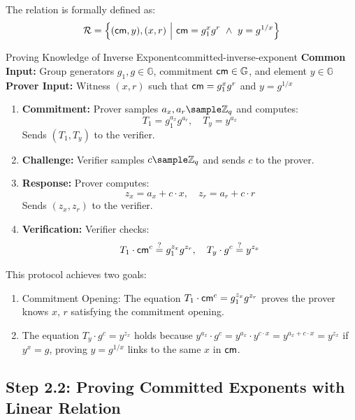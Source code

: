 The relation is formally defined as:
\[
\mathcal{R} = \left\{ (\cm, y), (x, r) \ \middle|\ \cm = g_1^x g^r \ \land\ y = g^{1/x} \right\}
\]

\begin{protocol}{Proving Knowledge of Inverse Exponent}{committed-inverse-exponent}\label{pok-committed-inverse-exponent}
\textbf{Common Input:} Group generators $g_1, g \in \mathbb{G}$, commitment $\mathsf{cm} \in \mathbb{G}$, and element $y \in \mathbb{G}$ \\
\textbf{Prover Input:} Witness $(x, r)$ such that $\mathsf{cm} = g_1^x g^r$ and $y = g^{1/x}$
\begin{enumerate}
    \item \textbf{Commitment:} Prover samples $a_x, a_r \sample \mathbb{Z}_q$ and computes:
    \[
    T_1 = g_1^{a_x} g^{a_r}, \quad T_y = y^{a_x}
    \]
    Sends $(T_1, T_y)$ to the verifier.

    \item \textbf{Challenge:} Verifier samples $c  \sample  \mathbb{Z}_q$ and sends $c$ to the prover.

    \item \textbf{Response:} Prover computes:
    \[
    z_x = a_x + c \cdot x, \quad z_r = a_r + c \cdot r
    \]
    Sends $(z_x, z_r)$ to the verifier.

    \item \textbf{Verification:} Verifier checks:
    \[
    T_1 \cdot \mathsf{cm}^c \stackrel{?}{=} g_1^{z_x} g^{z_r}, \quad T_y \cdot g^c \stackrel{?}{=} y^{z_x}
    \]
\end{enumerate}
\end{protocol}

This protocol achieves two goals:
\begin{enumerate}
    \item Commitment Opening: The equation $T_1 \cdot \mathsf{cm}^c = g_1^{z_x} g^{z_r}$ proves the prover knows $x$, $r$ satisfying the commitment opening.
    \item The equation $T_y \cdot g^c = y^{z_x}$ holds because $y^{a_x} \cdot g^c = y^{a_x} \cdot y^{c \cdot x} = y^{a_x + c \cdot x} = y^{z_x}$ if $y^x = g$, proving $y = g^{1/x}$ links to the same $x$ in $\mathsf{cm}$.
\end{enumerate}






\newpage
\subsection{Step 2.2: Proving Committed Exponents with Linear Relation}

